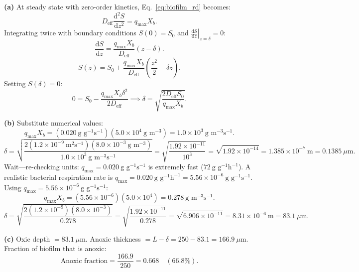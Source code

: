 \documentclass[12pt, a4paper, oneside]{report}
\begin{document}
\begin{solution}
  \textbf{(a)} At steady state with zero-order kinetics, Eq.~\eqref{eq:biofilm_rd} becomes:
  \[
    D_{\text{eff}} \frac{\mathrm{d}^2 S}{\mathrm{d}z^2} = q_{\max} X_b.
  \]
  Integrating twice with boundary conditions $S(0) = S_0$ and $\left.\frac{\mathrm{d}S}{\mathrm{d}z}\right|_{z=\delta} = 0$:
  \[
    \frac{\mathrm{d}S}{\mathrm{d}z} = \frac{q_{\max} X_b}{D_{\text{eff}}} (z - \delta).
  \]
  \[
    S(z) = S_0 + \frac{q_{\max} X_b}{D_{\text{eff}}} \left(\frac{z^2}{2} - \delta z\right).
  \]
  Setting $S(\delta) = 0$:
  \[
    0 = S_0 - \frac{q_{\max} X_b \delta^2}{2 D_{\text{eff}}} \implies \delta = \sqrt{\frac{2 D_{\text{eff}} S_0}{q_{\max} X_b}}.
  \]

  \textbf{(b)} Substitute numerical values:
  \[
    q_{\max} X_b = (0.020~\text{g~g}^{-1}\text{s}^{-1})(5.0 \times 10^4~\text{g~m}^{-3}) = 1.0 \times 10^3~\text{g~m}^{-3}\text{s}^{-1}.
  \]
  \[
    \delta = \sqrt{\frac{2(1.2 \times 10^{-9}~\text{m}^2\text{s}^{-1})(8.0 \times 10^{-3}~\text{g~m}^{-3})}{1.0 \times 10^3~\text{g~m}^{-3}\text{s}^{-1}}} = \sqrt{\frac{1.92 \times 10^{-11}}{10^3}} = \sqrt{1.92 \times 10^{-14}} = 1.385 \times 10^{-7}~\text{m} = 0.1385~\mu\text{m}.
  \]
  Wait—re-checking units: $q_{\max} = 0.020~\text{g~g}^{-1}\text{s}^{-1}$ is extremely fast ($72~\text{g~g}^{-1}\text{h}^{-1}$). A realistic bacterial respiration rate is $q_{\max} = 0.020~\text{g~g}^{-1}\text{h}^{-1} = 5.56 \times 10^{-6}~\text{g~g}^{-1}\text{s}^{-1}$.
  Using $q_{\max} = 5.56 \times 10^{-6}~\text{g~g}^{-1}\text{s}^{-1}$:
  \[
    q_{\max} X_b = (5.56 \times 10^{-6})(5.0 \times 10^4) = 0.278~\text{g~m}^{-3}\text{s}^{-1}.
  \]
  \[
    \delta = \sqrt{\frac{2(1.2 \times 10^{-9})(8.0 \times 10^{-3})}{0.278}} = \sqrt{\frac{1.92 \times 10^{-11}}{0.278}} = \sqrt{6.906 \times 10^{-11}} = 8.31 \times 10^{-6}~\text{m} = 83.1~\mu\text{m}.
  \]

  \textbf{(c)} Oxic depth $= 83.1~\mu\text{m}$.
  Anoxic thickness $= L - \delta = 250 - 83.1 = 166.9~\mu\text{m}$.
  Fraction of biofilm that is anoxic:
  \[
    \text{Anoxic fraction} = \frac{166.9}{250} = 0.668 \quad (66.8\%).
  \]
\end{solution}
\end{document}
